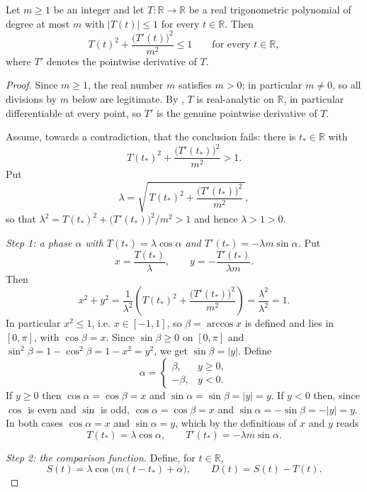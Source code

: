 \begin{theorem}
Let $m\ge1$ be an integer and let $T:\mathbb{R}\to\mathbb{R}$ be a real
trigonometric polynomial of degree at most $m$ with
$\lvert T(t)\rvert\le1$ for every $t\in\mathbb{R}$. Then
\[
  T(t)^2+\frac{\bigl(T'(t)\bigr)^2}{m^2}\le1
  \qquad\text{for every }t\in\mathbb{R},
\]
where $T'$ denotes the pointwise derivative of $T$.
\end{theorem}
\begin{proof}
Since $m\ge1$, the real number $m$ satisfies $m>0$; in particular $m\ne0$, so
all divisions by $m$ below are legitimate. By , $T$ is
real-analytic on $\mathbb{R}$, in particular differentiable at every point, so
$T'$ is the genuine pointwise derivative of $T$.

Assume, towards a contradiction, that the conclusion fails: there is
$t_*\in\mathbb{R}$ with
\[
  T(t_*)^2+\frac{\bigl(T'(t_*)\bigr)^2}{m^2}>1 .
\]
Put
\[
  \lambda=\sqrt{\,T(t_*)^2+\frac{\bigl(T'(t_*)\bigr)^2}{m^2}\,},
\]
so that $\lambda^2=T(t_*)^2+\bigl(T'(t_*)\bigr)^2/m^2>1$ and hence
$\lambda>1>0$.

\emph{Step 1: a phase $\alpha$ with $T(t_*)=\lambda\cos\alpha$ and
$T'(t_*)=-\lambda m\sin\alpha$.} Put
\[
  x=\frac{T(t_*)}{\lambda},\qquad y=-\frac{T'(t_*)}{\lambda m} .
\]
Then
\[
  x^2+y^2=\frac{1}{\lambda^2}\left(T(t_*)^2+\frac{\bigl(T'(t_*)\bigr)^2}{m^2}\right)
  =\frac{\lambda^2}{\lambda^2}=1 .
\]
In particular $x^2\le1$, i.e. $x\in[-1,1]$, so $\beta=\arccos x$ is defined and
lies in $[0,\pi]$, with $\cos\beta=x$. Since $\sin\beta\ge0$ on $[0,\pi]$ and
$\sin^2\beta=1-\cos^2\beta=1-x^2=y^2$, we get $\sin\beta=\lvert y\rvert$. Define
\[
  \alpha=\begin{cases}\beta,&y\ge0,\\-\beta,&y<0.\end{cases}
\]
If $y\ge0$ then $\cos\alpha=\cos\beta=x$ and
$\sin\alpha=\sin\beta=\lvert y\rvert=y$. If $y<0$ then, since $\cos$ is even and
$\sin$ is odd, $\cos\alpha=\cos\beta=x$ and
$\sin\alpha=-\sin\beta=-\lvert y\rvert=y$. In both cases $\cos\alpha=x$ and
$\sin\alpha=y$, which by the definitions of $x$ and $y$ reads
\begin{equation}\label{eq:bs-phase}
  T(t_*)=\lambda\cos\alpha,
  \qquad
  T'(t_*)=-\lambda m\sin\alpha .
\end{equation}

\emph{Step 2: the comparison function.} Define, for $t\in\mathbb{R}$,
\[
  S(t)=\lambda\cos\bigl(m(t-t_*)+\alpha\bigr),
  \qquad
  D(t)=S(t)-T(t).
\]


\end{proof}
